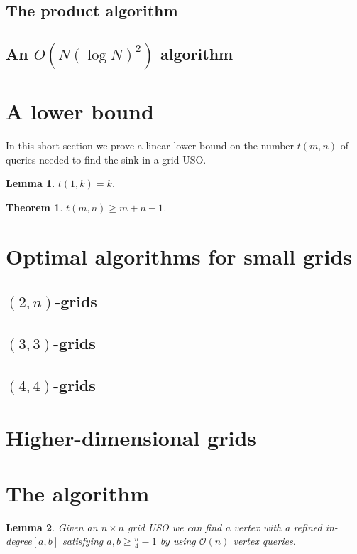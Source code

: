 \documentclass[a4paper,10pt]{article}
\newtheorem{lemma}{Lemma}
\newtheorem{theorem}{Theorem}
\newcommand{\indegree}{refined in-degree\xspace}
\begin{document}
\subsection{The product algorithm}

\subsection{An $O(N (\log N)^2)$ algorithm}

\section{A lower bound}

In this short section we prove a linear lower bound on the number $t(m,n)$ of
queries needed to find the sink in a grid USO.

\begin{lemma}
    $ t(1,k) = k $.
\end{lemma}

\begin{theorem}
    $ t(m,n) \ge m+n-1 $.
\end{theorem}

\section{Optimal algorithms for small grids}

\subsection{$(2 , n)$-grids}
\subsection{$(3 , 3)$-grids}
\subsection{$(4 , 4)$-grids}

\section{Higher-dimensional grids}


\section{The algorithm}

\begin{lemma}
 Given an $n\times n$ grid USO we can find a vertex with a \indegree $[a,b]$ satisfying $a, b \geq \frac{n}{4} - 1$ by using $\mathcal{O}(n)$ vertex queries.
\end{lemma}
\end{document}

